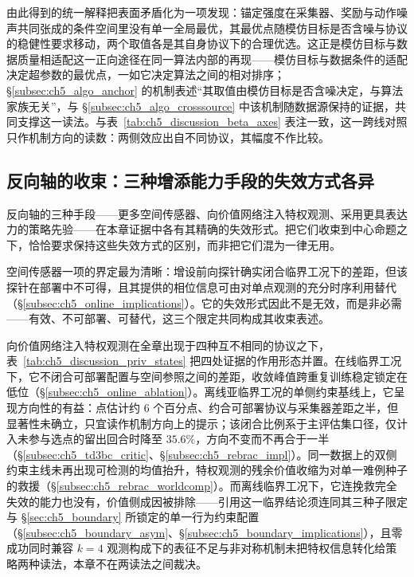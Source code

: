 由此得到的统一解释把表面矛盾化为一项发现：锚定强度在采集器、奖励与动作噪声共同张成的条件空间里没有单一全局最优，其最优点随模仿目标是否含噪与协议的稳健性要求移动，两个取值各是其自身协议下的合理优选。这正是模仿目标与数据质量相适配这一正向途径在同一算法内部的再现——模仿目标与数据条件的适配决定超参数的最优点，一如它决定算法之间的相对排序；\S\ref{subsec:ch5_algo_anchor} 的机制表述“其取值由模仿目标是否含噪决定，与算法家族无关”，与 \S\ref{subsec:ch5_algo_crosssource} 中该机制随数据源保持的证据，共同支撑这一读法。与表~\ref{tab:ch5_discussion_beta_axes} 表注一致，这一跨线对照只作机制方向的读数：两侧效应出自不同协议，其幅度不作比较。

\subsection{反向轴的收束：三种增添能力手段的失效方式各异}\label{subsec:ch5_discussion_negative}

反向轴的三种手段——更多空间传感器、向价值网络注入特权观测、采用更具表达力的策略先验——在本章证据中各有其精确的失效形式。把它们收束到中心命题之下，恰恰要求保持这些失效方式的区别，而非把它们混为一律无用。

空间传感器一项的界定最为清晰：增设前向探针确实闭合临界工况下的差距，但该探针在部署中不可得，且其提供的相位信息可由对单点观测的充分时序利用替代（\S\ref{subsec:ch5_online_implications}）。它的失效形式因此不是无效，而是非必需——有效、不可部署、可替代，这三个限定共同构成其收束表述。

向价值网络注入特权观测在全章出现于四种互不相同的协议之下，表~\ref{tab:ch5_discussion_priv_states} 把四处证据的作用形态并置。在线临界工况下，它不闭合可部署配置与空间参照之间的差距，收敛峰值跨重复训练稳定锁定在低位（\S\ref{subsec:ch5_online_ablation}）。离线亚临界工况的单侧约束基线上，它呈现方向性的有益：点估计约 $6$ 个百分点、约合可部署协议与采集器差距之半，但显著性未确立，只宜读作机制方向上的提示；该闭合比例系于主评估集口径，仅计入未参与选点的留出回合时降至 $35.6\%$，方向不变而不再合于一半（\S\ref{subsec:ch5_td3bc_critic}、\S\ref{subsec:ch5_rebrac_impl}）。同一数据上的双侧约束主线未再出现可检测的均值抬升，特权观测的残余价值收缩为对单一难例种子的救援（\S\ref{subsec:ch5_rebrac_worldcomp}）。而离线临界工况下，它连挽救完全失效的能力也没有，价值侧成因被排除——引用这一临界结论须连同其三种子限定与 \S\ref{sec:ch5_boundary} 所锁定的单一行为约束配置（\S\ref{subsec:ch5_boundary_asym}、\S\ref{subsec:ch5_boundary_implications}），且零成功同时兼容 $k=4$ 观测构成下的表征不足与非对称机制未把特权信息转化给策略两种读法，本章不在两读法之间裁决。

